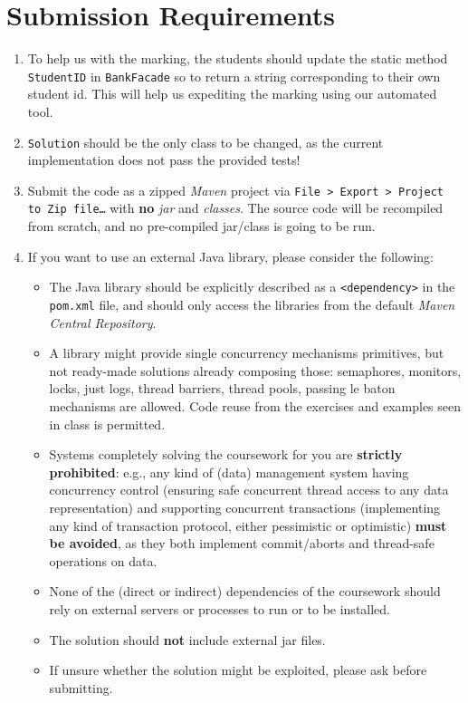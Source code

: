 \documentclass{article}
\begin{document}
	\section*{Submission Requirements}
	\begin{enumerate}
\item To help us with the marking, the students should update the static method \texttt{StudentID}  in \texttt{BankFacade} so to return a string corresponding to their own student id. This will help us expediting the marking using our automated tool.
		\item \texttt{Solution} should be the only class to be changed, as the current implementation does not pass the provided tests! 

		\item Submit the code as a zipped \textit{Maven} project via \texttt{File > Export > Project to Zip file\dots} with \textbf{no} \textit{jar} and \textit{classes}. The source code will be recompiled from scratch, and no pre-compiled jar/class is going to be run.
		 
		\item If you want to use an external Java library, please consider the following:
		\begin{itemize}
			\item The Java library should be explicitly described as a \texttt{<dependency>} in the \texttt{pom.xml} file, and should only access the libraries from the default \textit{Maven Central Repository}.
			\item A library might provide single concurrency mechanisms primitives, but not ready-made solutions already composing those: semaphores, monitors, locks, just logs, thread barriers, thread pools, passing le baton mechanisms are allowed. Code reuse from the exercises and examples seen in class is permitted.
			
			\item Systems completely solving the coursework for you are \textbf{strictly prohibited}: e.g., any kind of (data) management system having concurrency control (ensuring safe concurrent thread access to any data representation) and supporting concurrent transactions (implementing any kind of transaction protocol, either pessimistic or optimistic) \textbf{must be avoided}, as they both implement commit/aborts and thread-safe operations on data. 
			\item None of the (direct or indirect) dependencies of the coursework should rely on external servers or processes to run or to be installed.
			\item The solution should \textbf{not} include external jar files.
			\item If unsure whether the solution might be exploited, please ask before submitting.
		\end{itemize}
		 

\end{enumerate}
\end{document}

